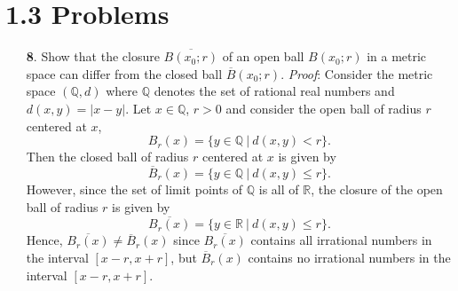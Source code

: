 \documentclass{article}
\begin{document}
\section*{1.3 Problems}
\begin{itemize}
    \item[\textbf{8}.] Show that the closure $\overline{B(x_0;r)}$ of an open ball $B(x_0;r)$ in a metric space can differ from the closed ball $\overline{B}(x_0;r)$.
    \newline\newline
    \textit{Proof}: Consider the metric space $(\mathbb{Q}, d)$ where $\mathbb{Q}$ denotes the set of rational real numbers and $d(x,y) = |x - y|$. Let $x \in \mathbb{Q}$, $r > 0$ and consider the open ball of radius $r$ centered at $x$, 
    \[B_r(x) = \{y \in \mathbb{Q} \:|\: d(x,y) < r\}.\] 
    Then the closed ball of radius $r$ centered at $x$ is given by
    \[\overline{B}_r(x) = \{y \in \mathbb{Q} \:|\: d(x,y) \leq r\}.\]
    However, since the set of limit points of $\mathbb{Q}$ is all of $\mathbb{R}$, the closure of the open ball of radius $r$ is given by
    \[\overline{B_r(x)} = \{y \in \mathbb{R} \:|\: d(x,y) \leq r\}.\]
    Hence, $\overline{B_r(x)} \neq \overline{B}_r(x)$ since $\overline{B_r(x)}$ contains all irrational numbers in the interval $[x - r, x + r]$, but $\overline{B}_r(x)$ contains no irrational numbers in the interval $[x - r, x + r]$.
\end{itemize}
\end{document}
